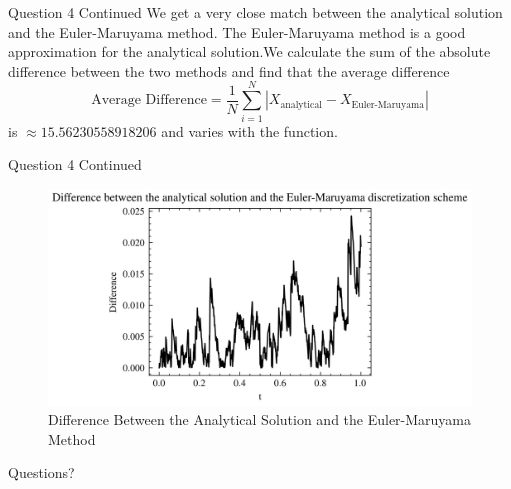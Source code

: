\documentclass[compress,12pt]{beamer}
\begin{document}
\begin{frame}{Question 4 Continued}
    We get a very close match between the analytical solution and the Euler-Maruyama method. The Euler-Maruyama method is a good approximation for the analytical solution.We calculate
    the sum of the absolute difference between the two methods and find that the average difference
    \begin{equation*}
        \text{Average Difference} = \frac{1}{N} \sum_{i=1}^{N} |X_{\text{analytical}} - X_{\text{Euler-Maruyama}}|
    \end{equation*}
    is $\approx 15.56230558918206$ and varies with the function.
\end{frame}

\begin{frame}{Question 4 Continued}
    \begin{figure}
        \centering
        \includegraphics{imgs/difference.png}
        \caption{Difference Between the Analytical Solution and the Euler-Maruyama Method}
    \end{figure}
\end{frame}

\End
\begin{frame}
      \centering
      Questions?
\end{frame}
\end{document}
